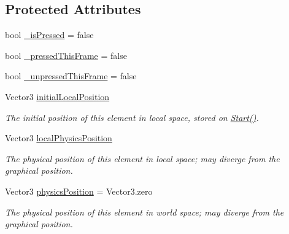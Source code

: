 \subsection*{Protected Attributes}
\begin{DoxyCompactItemize}
\item 
bool \mbox{\hyperlink{class_leap_1_1_unity_1_1_interaction_1_1_interaction_button_ae2adb238902214b7d9b2dc00cad7945e}{\+\_\+is\+Pressed}} = false
\item 
bool \mbox{\hyperlink{class_leap_1_1_unity_1_1_interaction_1_1_interaction_button_aba499ecdce469e3288650158dce28735}{\+\_\+pressed\+This\+Frame}} = false
\item 
bool \mbox{\hyperlink{class_leap_1_1_unity_1_1_interaction_1_1_interaction_button_a24190962b49e9308337362aca6c3e157}{\+\_\+unpressed\+This\+Frame}} = false
\item 
Vector3 \mbox{\hyperlink{class_leap_1_1_unity_1_1_interaction_1_1_interaction_button_aaff55c4ea819215e2100b6906f970746}{initial\+Local\+Position}}
\begin{DoxyCompactList}\small\item\em The initial position of this element in local space, stored on \mbox{\hyperlink{class_leap_1_1_unity_1_1_interaction_1_1_interaction_button_a24a0efb036a0b9ac108e9bf1d5b9fb62}{Start()}}. \end{DoxyCompactList}\item 
Vector3 \mbox{\hyperlink{class_leap_1_1_unity_1_1_interaction_1_1_interaction_button_a33b1313c855fc4e54f7d85dfa17000f0}{local\+Physics\+Position}}
\begin{DoxyCompactList}\small\item\em The physical position of this element in local space; may diverge from the graphical position. \end{DoxyCompactList}\item 
Vector3 \mbox{\hyperlink{class_leap_1_1_unity_1_1_interaction_1_1_interaction_button_a1953b5ee88c27d531b7543c16c9400a7}{physics\+Position}} = Vector3.\+zero
\begin{DoxyCompactList}\small\item\em The physical position of this element in world space; may diverge from the graphical position. \end{DoxyCompactList}\end{DoxyCompactItemize}
